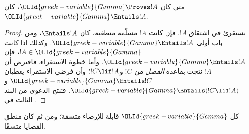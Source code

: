 \documentclass[../../../include/open-logic-section]{subfiles}
\begin{document}


\begin{thm}[السلامة] 
متى كان ${\OLId{greek-variable}{Gamma}}\Proves!A$، كان
${\OLId{greek-variable}{Gamma}} \Entails !A$. 
\end{thm}

\begin{proof} 
نستقرئ في اشتقاق $!A$. فإن كانت $!A$ مسلّمة منطقية، كان $\Entails
!A$، ومن باب أولى ${\OLId{greek-variable}{Gamma}} \Entails!A$. وكذلك إذا كانت $!A \in {\OLId{greek-variable}{Gamma}}$،
فإن ${\OLId{greek-variable}{Gamma}} \Entails!A$. وأما خطوة الاستقراء، فافترض أن $!A$ نتجت بقاعدة
\emph{الفصل} من $!C$ و$!C\lif!A$؛ وأن فرضي الاستقراء يعطيان
${\OLId{greek-variable}{Gamma}} \Entails !C$ و${\OLId{greek-variable}{Gamma}} \Entails (!C\lif !A)$. فتنتج الدعوى من
البند الثالث في . 
\end{proof}

\begin{cor} 
كل ${\OLId{greek-variable}{Gamma}}$ قابلة للإرضاء متسقة؛ ومن ثم كان منطق القضايا متسقًا. 
\end{cor}
\end{document}
